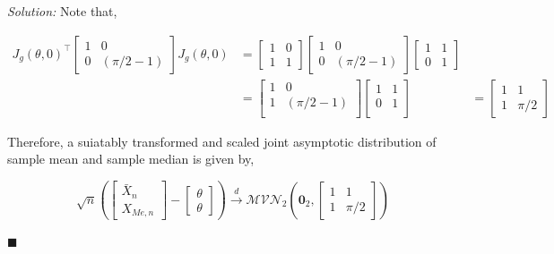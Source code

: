 \documentclass[12pt]{article}
\theoremstyle{definition}
\newenvironment{answer}{\textit{Solution: }\quad }{ \hfill $\blacksquare$}
\numberwithin{equation}{section}
\begin{document}
\begin{answer}
    Note that,

    \begin{align*}
        J_g(\theta, 0)^{\intercal} \begin{bmatrix}
            1 & 0\\
            0 & \left(\pi/2 - 1\right)
        \end{bmatrix} J_g(\theta, 0)
        & = \begin{bmatrix}
            1 & 0\\
            1 & 1
        \end{bmatrix}
        \begin{bmatrix}
            1 & 0\\
            0 & \left(\pi/2 - 1\right)
        \end{bmatrix}
        \begin{bmatrix}
            1 & 1\\
            0 & 1
        \end{bmatrix}
        & \\
        & = \begin{bmatrix}
            1 & 0\\
            1 & \left(\pi/2 - 1\right)\\
        \end{bmatrix} \begin{bmatrix}
            1 & 1\\
            0 & 1\\
        \end{bmatrix}
        & = \begin{bmatrix}
            1 & 1\\
            1 & \pi/2
        \end{bmatrix}
    \end{align*}

    Therefore, a suiatably transformed and scaled joint asymptotic distribution of sample mean and sample median is given by,

    \begin{equation*}
        \sqrt{n} \left(
        \begin{bmatrix}
            \bar{X}_n\\ X_{Me, n}
        \end{bmatrix} - \begin{bmatrix}
            \theta \\ \theta
        \end{bmatrix}
    \right) \xrightarrow{d} \mathcal{MVN}_2\left( \bm{0}_2,
    \begin{bmatrix}
        1 & 1\\
        1 & \pi/2
    \end{bmatrix}
    \right)
    \end{equation*}


\end{answer}
\end{document}
